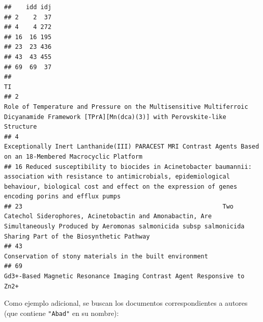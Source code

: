 \documentclass[
]{book}
\newenvironment{Shaded}{\begin{snugshade}}{\end{snugshade}}
\newcommand{\CommentTok}[1]{\textcolor[rgb]{0.56,0.35,0.01}{\textit{#1}}}
\newcommand{\FunctionTok}[1]{\textcolor[rgb]{0.13,0.29,0.53}{\textbf{#1}}}
\newcommand{\NormalTok}[1]{#1}
\newcommand{\OtherTok}[1]{\textcolor[rgb]{0.56,0.35,0.01}{#1}}
\newcommand{\SpecialCharTok}[1]{\textcolor[rgb]{0.81,0.36,0.00}{\textbf{#1}}}
\newcommand{\StringTok}[1]{\textcolor[rgb]{0.31,0.60,0.02}{#1}}
\theoremstyle{break}
\theoremstyle{nonumberplain}
\renewcommand{\CommentTok}[1]{\textcolor[rgb]{0.41,0.41,0.41}{\texttt{#1}}}
\begin{document}
\begin{verbatim}
##    idd idj
## 2    2  37
## 4    4 272
## 16  16 195
## 23  23 436
## 43  43 455
## 69  69  37
##                                                                                                                                                                                                                                 TI
## 2                                                                                      Role of Temperature and Pressure on the Multisensitive Multiferroic Dicyanamide Framework [TPrA][Mn(dca)(3)] with Perovskite-like Structure
## 4                                                                                                                    Exceptionally Inert Lanthanide(III) PARACEST MRI Contrast Agents Based on an 18-Membered Macrocyclic Platform
## 16 Reduced susceptibility to biocides in Acinetobacter baumannii: association with resistance to antimicrobials, epidemiological behaviour, biological cost and effect on the expression of genes encoding porins and efflux pumps
## 23                                                       Two Catechol Siderophores, Acinetobactin and Amonabactin, Are Simultaneously Produced by Aeromonas salmonicida subsp salmonicida Sharing Part of the Biosynthetic Pathway
## 43                                                                                                                                                                        Conservation of stony materials in the built environment
## 69                                                                                                                                                         Gd3+-Based Magnetic Resonance Imaging Contrast Agent Responsive to Zn2+
\end{verbatim}

Como ejemplo adicional, se buscan los documentos correspondientes a autores
(que contiene \texttt{"Abad"} en su nombre):

\begin{Shaded}
\end{Shaded}
\end{document}
